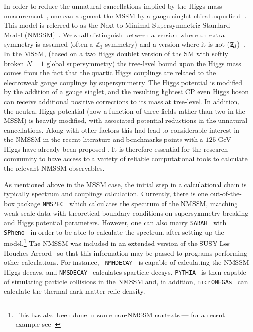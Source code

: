 \documentclass[final,3p,times,pdflatex]{elsarticle}
\def\code#1{\small{\tt #1}\normalsize}
\newcommand{\Zv}{\,\mathbf{\backslash}\mkern-11.0mu{\mathbb{Z}}_{3}} %
\begin{document}
In order to reduce the unnatural cancellations implied by the Higgs mass
measurement~\cite{Delgado:2010uj,Ellwanger:2011mu,King:2012tr,Perelstein:2012qg,Gherghetta:2012gb}, 
one can augment the MSSM by a gauge singlet chiral
superfield~\cite{BasteroGil:2000bw,Ellwanger:2009dp,Maniatis:2009re}. This model is referred to as the 
Next-to-Minimal 
Supersymmetric Standard Model (NMSSM)~\cite{NMSSM}. We shall distinguish
between a 
version where an extra symmetry is assumed (often a $\mathbb{Z}_3$ symmetry) 
and a version where it is not
($\Zv$)~\cite{Delgado:2010uj,Ell08,Ross:2011xv,Ross:2012nr}. 
In the MSSM, (based on a two Higgs doublet version of the SM with
softly broken $N=1$ global supersymmetry)
the tree-level bound upon the Higgs mass comes from the fact that 
the quartic Higgs couplings are related to the electroweak gauge couplings by
supersymmetry. The Higgs potential is modified by the addition of a gauge
singlet, and the resulting lightest CP even Higgs boson can receive additional
positive corrections to its mass at tree-level. In addition, the neutral Higgs
potential (now a function of three fields rather than two in the MSSM) is
heavily modified, with associated potential reductions in the unnatural
cancellations. Along with other factors this had lead to considerable interest in the NMSSM
in the recent literature and benchmarks points with a $125$ GeV Higgs have already been proposed \cite{King:2012is}.
It is therefore essential for the research community
to have access to a variety of reliable computational tools to calculate the relevant NMSSM observables. 

As mentioned above in the MSSM case, the initial step in a calculational
chain is 
typically spectrum and couplings calculation. Currently, there is one
out-of-the-box package {\tt NMSPEC}~\cite{Ellwanger:2006rn} which calculates
the spectrum of the 
NMSSM, matching weak-scale data with theoretical boundary conditions on
supersymmetry breaking and Higgs potential parameters. However, one can also 
marry {\tt SARAH}~\cite{Staub:2009bi,Staub:2010jh,Staub:2012pb,Staub:2013tta} with {\tt
  SPheno}~\cite{Porod:2003um} in order to be 
able to 
calculate the spectrum after setting up the model.\footnote{This has also been done in some non-NMSSM contexts --- for a recent example see \cite{Bharucha:2013ela}.} The NMSSM was included in
an extended version of the SUSY Les Houches Accord~\cite{Allanach:2008qq} so
that this 
information may be passed to programs performing other calculations. For
instance, 
{\tt
  NMHDECAY}~\cite{Ellwanger:2005dv} is 
capable of calculating the NMSSM Higgs decays, and
{\tt NMSDECAY}~\cite{Muhlleitner:2003vg,Das:2011dg} calculates sparticle
decays. \code{PYTHIA}~\cite{Sjostrand:2007gs} is then capable of simulating
particle collisions in the NMSSM and, in addition, \code{micrOMEGAs}~\cite{Belanger:2008sj}
can calculate the thermal dark matter relic density.
\end{document}
